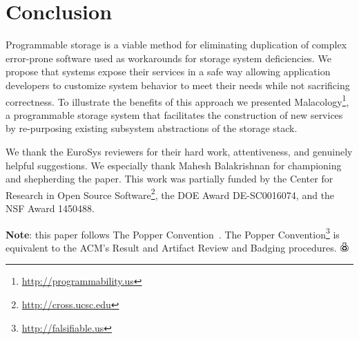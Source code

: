 \section{Conclusion}
\label{conclusion-and-future-work}

Programmable storage is a viable method for eliminating duplication of complex
error-prone software used as workarounds for storage system deficiencies. We
propose that systems expose their services in a safe way allowing application
developers to customize system behavior to meet their needs while not
sacrificing correctness. To illustrate the benefits of this approach we
presented Malacology\footnote{\url{http://programmability.us}}, a
programmable storage system that facilitates the construction of new services
by re-purposing existing subsystem abstractions of the storage stack. 


\acks

We thank the EuroSys reviewers for their hard work, attentiveness, and
genuinely helpful suggestions. We especially thank Mahesh Balakrishnan for
championing and shepherding the paper. This work was partially funded by the
Center for Research in Open Source
Software\footnote{\url{http://cross.ucsc.edu}}, the DOE Award
DE-SC0016074, and the NSF Award 1450488.

\textbf{Note}: this paper follows The Popper
Convention~\cite{jimenez_popper_2016}. The Popper
Convention\footnote{\url{http://falsifiable.us}} is equivalent to
the ACM's Result and Artifact Review and Badging procedures.
\includegraphics[width=3.5mm]{figures/popper.png}
